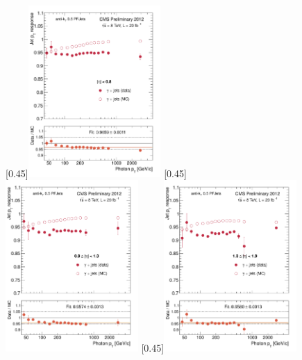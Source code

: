 \begin{figure}[p]
    \centering
    \subcaptionbox{\label{fig:bal_eta008}}[0.45\textwidth]{\includegraphics[width=0.45\textwidth]{chapitre4/figs/resp_balancing/response_eta008_balancing.pdf}}\hfill
    \subcaptionbox{\label{fig:bal_eta0813}}[0.45\textwidth]{\includegraphics[width=0.45\textwidth]{chapitre4/figs/resp_balancing/response_eta0813_balancing.pdf}}
    \subcaptionbox{\label{fig:bal_eta1319}}[0.45\textwidth]{\includegraphics[width=0.45\textwidth]{chapitre4/figs/resp_balancing/response_eta1319_balancing.pdf}}\hfill

\end{figure}
